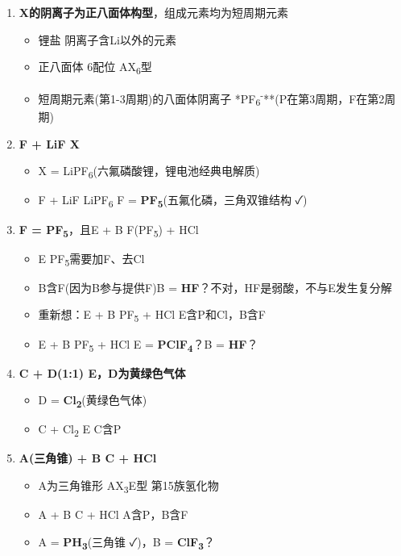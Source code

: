 \begin{enumerate}
\def\labelenumi{\arabic{enumi}.}
\tightlist
\item
  \textbf{X的阴离子为正八面体构型}，组成元素均为短周期元素

  \begin{itemize}
  \tightlist
  \item
    锂盐 \箭 阴离子含Li以外的元素
  \item
    正八面体 \箭 6配位 \箭 AX\textsubscript{6}型
  \item
    短周期元素(第1-3周期)的八面体阴离子 \箭 **PF\textsubscript{6}\textsuperscript{-}**(P在第3周期，F在第2周期)
  \end{itemize}
\item
  \textbf{F + LiF \箭 X}

  \begin{itemize}
  \tightlist
  \item
    X = LiPF\textsubscript{6}(六氟磷酸锂，锂电池经典电解质)
  \item
    F + LiF \箭 LiPF\textsubscript{6} \箭 F = \textbf{PF\textsubscript{5}}(五氟化磷，三角双锥结构 ✓)
  \end{itemize}
\item
  \textbf{F = PF\textsubscript{5}}，且E + B \箭 F(PF\textsubscript{5}) + HCl

  \begin{itemize}
  \tightlist
  \item
    E \箭 PF\textsubscript{5}需要加F、去Cl
  \item
    B含F(因为B参与提供F)\箭 B = \textbf{HF}？不对，HF是弱酸，不与E发生复分解
  \item
    重新想：E + B \箭 PF\textsubscript{5} + HCl \箭 E含P和Cl，B含F
  \item
    E + B \箭 PF\textsubscript{5} + HCl \箭 E = \textbf{PClF\textsubscript{4}}？B = \textbf{HF}？
  \end{itemize}
\item
  \textbf{C + D(1:1) \箭 E，D为黄绿色气体}

  \begin{itemize}
  \tightlist
  \item
    D = \textbf{Cl\textsubscript{2}}(黄绿色气体)
  \item
    C + Cl\textsubscript{2} \箭 E \箭 C含P
  \end{itemize}
\item
  \textbf{A(三角锥) + B \箭 C + HCl}

  \begin{itemize}
  \tightlist
  \item
    A为三角锥形 \箭 AX\textsubscript{3}E型 \箭 第15族氢化物
  \item
    A + B \箭 C + HCl \箭 A含P，B含F
  \item
    A = \textbf{PH\textsubscript{3}}(三角锥 ✓)，B = \textbf{ClF\textsubscript{3}}？
  \end{itemize}
\end{enumerate}

